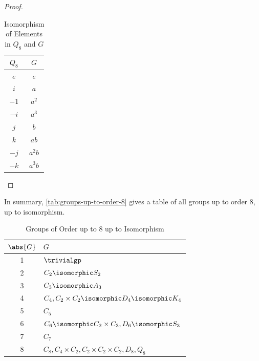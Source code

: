\begin{proof}
\begin{itemize}
\begin{itemize}
            \begin{table}[ht!]
                \centering
                \begin{tabular}{cc}
                    \(Q_8\) & \(G\) \\
                    \hline
                    \(e\) & \(e\) \\
                    \(i\) & \(a\) \\
                    \(-1\) & \(a^2\) \\
                    \(-i\) & \(a^3\) \\
                    \(j\) & \(b\) \\
                    \(k\) & \(a b\) \\
                    \(-j\) & \(a^2 b\) \\
                    \(-k\) & \(a^3 b\)
                \end{tabular}
                \caption{Isomorphism of Elements in \(Q_8\) and \(G\)}
                \label{tab:quartonian-group-isomorphism}
            \end{table}
        \end{itemize}
    \end{itemize}
\end{proof}

In summary, \autoref{tab:groups-up-to-order-8} gives a table of all groups up to order 8, up to isomorphism.

\begin{table}[ht!]
    \centering
    \begin{tabular}{cl}
        \(\abs{G}\) & \(G\) \\
        \hline
        1 & \(\trivialgp\) \\
        2 & \(C_2 \isomorphic S_2\) \\
        3 & \(C_3 \isomorphic A_3\) \\
        4 & \(C_4, C_2 \times C_2 \isomorphic D_4 \isomorphic K_4\) \\
        5 & \(C_5\) \\
        6 & \(C_6 \isomorphic C_2 \times C_3, D_6 \isomorphic S_3\) \\
        7 & \(C_7\) \\
        8 & \(C_8, C_4 \times C_2, C_2 \times C_2 \times C_2, D_8, Q_8\)
    \end{tabular}
    \caption{Groups of Order up to 8 up to Isomorphism}
    \label{tab:groups-up-to-order-8}
\end{table}